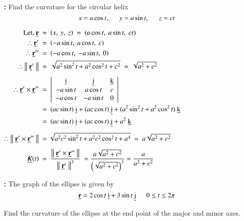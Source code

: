 \documentclass[12pt]{article}
\renewcommand{\vec}[1]{\underline{\mathrm{#1}}}
\renewcommand{\r}{\mathrm{\textbf{r}}}
\let\oldkappa\kappa
\renewcommand{\kappa}{\scalebox{1.25}{$\oldkappa$}}
\newcommand{\vf}[2][t]{\vec{#2}(#1)}
\newcommand{\norm}[1]{\left\lVert\ #1\ \right\rVert}
\begin{document}
\pagebreak
\textbf{:} Find the curvature for the circular helix \vspace{-\baselineskip}
$$x=a\cos{t}, \ \ \ \ \ \  y=a\sin{t}, \ \ \ \ \ \  z=ct$$

\vspace{-\baselineskip}
\vspace{1ex}
$\begin{aligned}
   \text{Let,\ } \vec{\r} \ & = \ \vecbf \ = \ \vecbf[a\cos{t}][a\sin{t}][ct]\\
   \therefore \vdt{\r} \ & = \ \vecbf[-a\sin{t}][a\cos{t}][c]\\
   \therefore \vdtt{\r} \ & = \ \vecbf[-a\cos{t}][-a\sin{t}][0]\\
   \therefore \norm{\vdt{\r}} \ & = \ \sqrt{a^2 \sin ^2 t+a^2 \cos ^2 t+c^2} \ = \ \sqrt{a^2+c^2} \\[1ex]
   \therefore \vdt{\r} \times \vdtt{\r} \ & = \
   \left|\begin{array}{ccc}
      \vec{i} & \vec{j} & \vec{k} \\
      -a\sin{t} & a\cos{t} & c \\
      -a\cos{t} & -a\sin{t} & 0
      \end{array}\right|\\
   \ & = \ \vecf[(ac\sin{t})][(ac\cos{t})][(a^2 \sin^2{t} + a^2 \cos^2{t})]\\
   \ & = \ \vecf[(ac\sin{t})][(ac\cos{t})][a^2]\\[1ex]
   \therefore \norm{\vdt{\r} \times \vdtt{\r}} \ & = \sqrt{a^2 c^2 \sin ^2 t+a^2 c^2 \cos ^2 t+a^4} \ = \ a\sqrt{a^2+c^2}\\[1ex]
   \vf{\kappa} \ &= \ \frac{\norm{\vdt{\r} \times \vdtt{\r}}}{\norm{\vdt{\r}}^3} \ =\frac{a \sqrt{a^2+c^2}}{\left(\sqrt{a^2+c^2}\right)^3} = \frac{a}{a^2+c^2}\\
\end{aligned}$


\pagebreak
\textbf{:} The graph of the ellipse is given by
\vspace{-\baselineskip}
$$\vec{\r} = \vecxy[2\cos{t}][3\sin{t}] \tabs 0 \leq t \leq 2\pi$$

\vspace{-\baselineskip}
Find the curvature of the ellipse at the end point of the major and minor axes.
\end{document}
